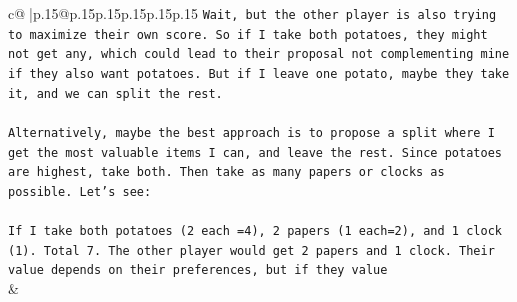 \documentclass{article}
\begin{document}
{\begin{supertabular}{c@{$\;$}|p{.15\linewidth}@{}p{.15\linewidth}p{.15\linewidth}p{.15\linewidth}p{.15\linewidth}p{.15\linewidth}}
{{{\texttt{Wait, but the other player is also trying to maximize their own score. So if I take both potatoes, they might not get any, which could lead to their proposal not complementing mine if they also want potatoes. But if I leave one potato, maybe they take it, and we can split the rest.} \\
\\ 
\texttt{Alternatively, maybe the best approach is to propose a split where I get the most valuable items I can, and leave the rest. Since potatoes are highest, take both. Then take as many papers or clocks as possible. Let's see:} \\
\\ 
\texttt{If I take both potatoes (2 each =4), 2 papers (1 each=2), and 1 clock (1). Total 7. The other player would get 2 papers and 1 clock. Their value depends on their preferences, but if they value} \\
            }
        }
    }
    & \\ \\


\end{supertabular}}
\end{document}
